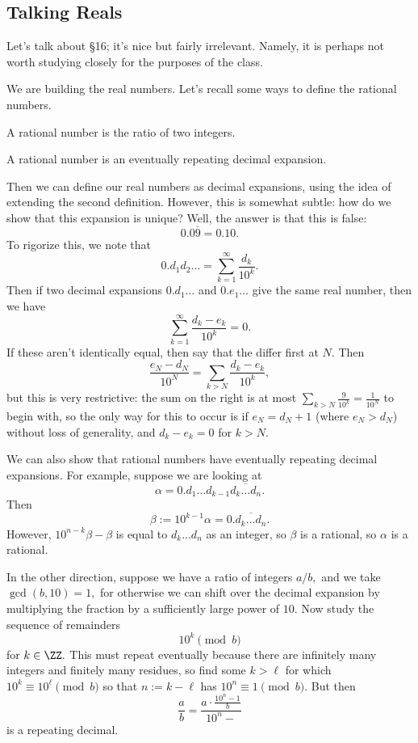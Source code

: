 \documentclass[../notes.tex]{subfiles}
\begin{document}
\subsection{Talking Reals}
Let's talk about \S16; it's nice but fairly irrelevant. Namely, it is perhaps not worth studying closely for the purposes of the class.

We are building the real numbers. Let's recall some ways to define the rational numbers.
\begin{definition}
	A rational number is the ratio of two integers.
\end{definition}
\begin{definition}
	A rational number is an eventually repeating decimal expansion.
\end{definition}
Then we can define our real numbers as decimal expansions, using the idea of extending the second definition. However, this is somewhat subtle: how do we show that this expansion is unique? Well, the answer is that this is false:
\[0.0\overline9=0.10.\]
To rigorize this, we note that
\[0.d_1d_2\ldots=\sum_{k=1}^\infty\frac{d_k}{10^k}.\]
Then if two decimal expansions $0.d_1\ldots$ and $0.e_1\ldots$ give the same real number, then we have
\[\sum_{k=1}^\infty\frac{d_k-e_k}{10^k}=0.\]
If these aren't identically equal, then say that the differ first at $N.$ Then
\[\frac{e_N-d_N}{10^N}=\sum_{k>N}\frac{d_k-e_k}{10^k},\]
but this is very restrictive: the sum on the right is at most $\sum_{k>N}\frac9{10^k}=\frac1{10^N}$ to begin with, so the only way for this to occur is if $e_N=d_N+1$ (where $e_N>d_N$) without loss of generality, and $d_k-e_k=0$ for $k>N.$

We can also show that rational numbers have eventually repeating decimal expansions. For example, suppose we are looking at
\[\alpha=0.d_1\ldots d_{k-1}\overline{d_k\ldots d_n}.\]
Then
\[\beta:=10^{k-1}\alpha=0.\overline{d_k\ldots d_n}.\]
However, $10^{n-k}\beta-\beta$ is equal to $d_k\ldots d_n$ as an integer, so $\beta$ is a rational, so $\alpha$ is a rational.

In the other direction, suppose we have a ratio of integers $a/b,$ and we take $\gcd(b,10)=1,$ for otherwise we can shift over the decimal expansion by multiplying the fraction by a sufficiently large power of $10.$ Now study the sequence of remainders
\[10^k\pmod b\]
for $k\in\ZZ.$ This must repeat eventually because there are infinitely many integers and finitely many residues, so find some $k>\ell$ for which $10^k\equiv10^\ell\pmod b$ so that $n:=k-\ell$ has $10^n\equiv1\pmod b.$ But then
\[\frac ab=\frac{a\cdot\frac{10^n-1}b}{10^n-}\]
is a repeating decimal.
\end{document}
